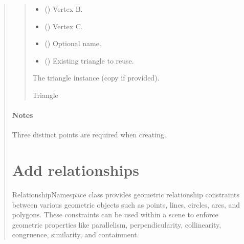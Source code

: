 \documentclass[letterpaper,10pt,english]{sphinxmanual}
\begin{document}
\begin{quote}
\begin{fulllineitems}
\begin{fulllineitems}
\begin{quote}
\begin{description}
\begin{itemize}
\item {} 
\sphinxAtStartPar
{} (\sphinxstyleliteralemphasis{\sphinxupquote{ | }}) \textendash{} Vertex B.

\item {} 
\sphinxAtStartPar
{} (\sphinxstyleliteralemphasis{\sphinxupquote{ | }}) \textendash{} Vertex C.

\item {} 
\sphinxAtStartPar
{} (\sphinxstyleliteralemphasis{\sphinxupquote{ | }}) \textendash{} Optional name.

\item {} 
\sphinxAtStartPar
{} (\sphinxstyleliteralemphasis{\sphinxupquote{ | }}) \textendash{} Existing triangle to reuse.

\end{itemize}

\sphinxAtStartPar
The triangle instance (copy if provided).

\sphinxAtStartPar
Triangle

\end{description}\end{quote}
\subsubsection*{Notes}

\sphinxAtStartPar
Three distinct points are required when creating.

\end{fulllineitems}


\end{fulllineitems}



\chapter{Add relationships}
\label{\detokenize{pygeox:module-pygeox.relationship}}\label{\detokenize{pygeox:add-relationships}}
\sphinxAtStartPar
RelationshipNamespace class provides geometric relationship constraints
between various geometric objects such as points, lines, circles, arcs, and polygons.
These constraints can be used within a scene to enforce geometric properties like
parallelism, perpendicularity, collinearity, congruence, similarity, and containment.


\end{quote}
\end{document}
